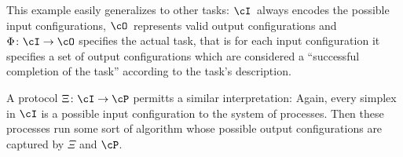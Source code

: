 This example easily generalizes to other tasks:
$\cI$~always encodes the possible input configurations,
$\cO$~represents valid output configurations and
$\Phi\colon\cI\to\cO$ specifies the actual task, that is
for each input configuration it specifies a set of output
configurations which are considered a \enquote{successful
completion of the task} according to the task's description.

A protocol $\Xi\colon\cI\to\cP$ permitts a similar interpretation:
Again, every simplex in $\cI$ is a possible input configuration to
the system of processes. Then these processes run some sort of
algorithm whose possible output configurations are captured
by $\Xi$ and $\cP$. 
